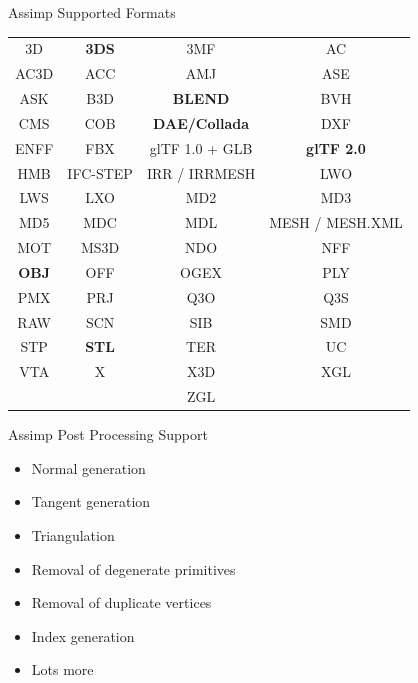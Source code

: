 \documentclass{beamer}
\begin{document}
\begin{frame}[fragile]{Assimp Supported Formats}
    \begin{table}
        \centering
        \begin{tabular}{cccc}
            3D           & \textbf{3DS} & 3MF                  & AC                \\
            AC3D         & ACC          & AMJ                  & ASE               \\
            ASK          & B3D          & \textbf{BLEND}       & BVH               \\
            CMS          & COB          & \textbf{DAE/Collada} & DXF               \\
            ENFF         & FBX          & glTF 1.0 + GLB       & \textbf{glTF 2.0} \\
            HMB          & IFC-STEP     & IRR / IRRMESH        & LWO               \\
            LWS          & LXO          & MD2                  & MD3               \\
            MD5          & MDC          & MDL                  & MESH / MESH.XML   \\
            MOT          & MS3D         & NDO                  & NFF               \\
            \textbf{OBJ} & OFF          & OGEX                 & PLY               \\
            PMX          & PRJ          & Q3O                  & Q3S               \\
            RAW          & SCN          & SIB                  & SMD               \\
            STP          & \textbf{STL} & TER                  & UC                \\
            VTA          & X            & X3D                  & XGL               \\
                         &              & ZGL                  &
        \end{tabular}
    \end{table}
\end{frame}

\begin{frame}[fragile]{Assimp Post Processing Support}
    \begin{itemize}
        \item Normal generation
        \item Tangent generation
        \item Triangulation
        \item Removal of degenerate primitives
        \item Removal of duplicate vertices
        \item Index generation
        \item Lots more
    \end{itemize}
\end{frame}
\end{document}
